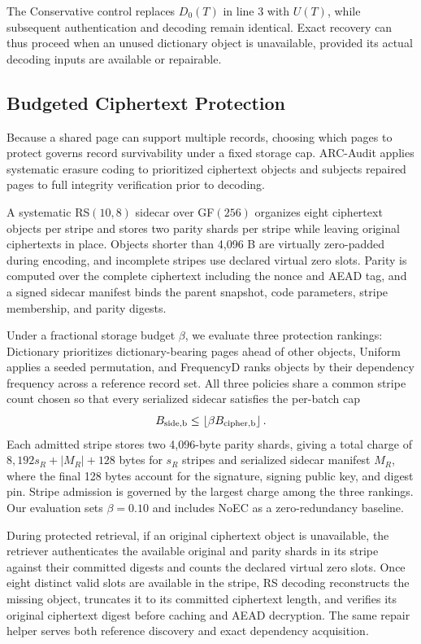 \documentclass[10pt,journal]{IEEEtran}
\begin{document}
The Conservative control
replaces $D_0(T)$ in line 3 with $U(T)$, while subsequent authentication and decoding remain
identical. Exact recovery can thus proceed when an unused dictionary object
is unavailable, provided its actual decoding inputs are available or repairable.

\subsection{Budgeted Ciphertext Protection}\label{sec:protection}
Because a shared page can support multiple records, choosing which pages to protect governs record survivability under a fixed storage cap. ARC-Audit applies systematic erasure coding to prioritized ciphertext objects and subjects repaired pages to full integrity verification prior to decoding.

A systematic RS$(10,8)$ sidecar over GF$(256)$ organizes eight ciphertext objects per stripe and stores two parity shards per stripe while leaving original ciphertexts in place. Objects shorter than 4,096 B are virtually zero-padded during encoding, and incomplete stripes use declared virtual zero slots. Parity is computed over the complete ciphertext including the nonce and AEAD tag, and a signed sidecar manifest binds the parent snapshot, code parameters, stripe membership, and parity digests.

Under a fractional storage budget $\beta$, we evaluate three protection rankings: Dictionary prioritizes dictionary-bearing pages ahead of other objects, Uniform applies a seeded permutation, and FrequencyD ranks objects by their dependency frequency across a reference record set. All three policies share a common stripe count chosen so that every serialized sidecar satisfies the per-batch cap
\begin{equation}\label{eq:budget}
B_{\rm side,b}\leq\left\lfloor\beta B_{\rm cipher,b}\right\rfloor.
\end{equation}
Each admitted stripe stores two 4,096-byte parity shards, giving a total charge of $8{,}192s_R+|M_R|+128$ bytes for $s_R$ stripes and serialized sidecar manifest $M_R$, where the final 128 bytes account for the signature, signing public key, and digest pin. Stripe admission is governed by the largest charge among the three rankings. Our evaluation sets $\beta=0.10$ and includes NoEC as a zero-redundancy baseline.

During protected retrieval, if an original ciphertext object is unavailable, the retriever authenticates the available original and parity shards in its stripe against their committed digests and counts the declared virtual zero slots. Once eight distinct valid slots are available in the stripe, RS decoding reconstructs the missing object, truncates it to its committed ciphertext length, and verifies its original ciphertext digest before caching and AEAD decryption. The same repair helper serves both reference discovery and exact dependency acquisition.
\end{document}
